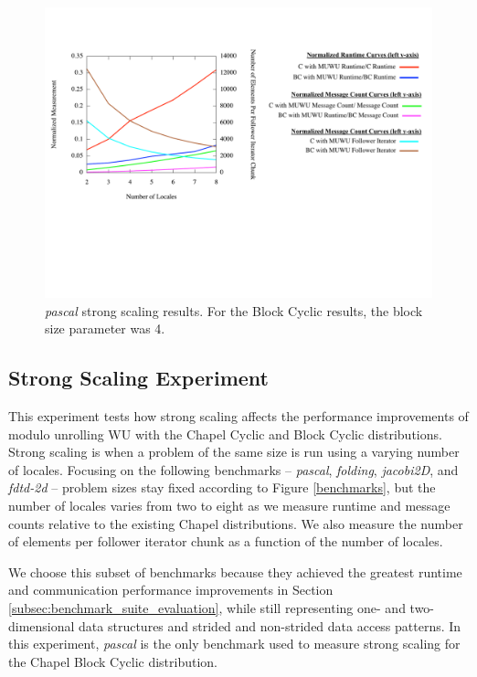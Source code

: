 \begin{figure}
\begin{center}
\includegraphics[width=\linewidth]{./Figures/strong_scaling/pascal.pdf}
\caption{\textit{pascal} strong scaling results. For the Block Cyclic results, the block size parameter was 4.}
\label{pascal_strong_scaling}
\end{center}
\end{figure}

\subsection{Strong Scaling Experiment}\label{subsec:strong_scaling}

This experiment tests how strong scaling affects the performance improvements of modulo unrolling WU with the Chapel Cyclic and Block Cyclic distributions. Strong scaling is when a problem of the same size is run using a varying number of locales. Focusing on the following benchmarks -- \textit{pascal}, \textit{folding}, \textit{jacobi2D}, and \textit{fdtd-2d} -- problem sizes stay fixed according to Figure \ref{benchmarks}, but the number of locales varies from two to eight as we measure runtime and message counts relative to the existing Chapel distributions. We also measure the number of elements per follower iterator chunk as a function of the number of locales. 

We choose this subset of benchmarks because they achieved the greatest runtime and communication performance improvements in Section \ref{subsec:benchmark_suite_evaluation}, while still representing one- and two-dimensional data structures and strided and non-strided data access patterns. In this experiment, \textit{pascal} is the only benchmark used to measure strong scaling for the Chapel Block Cyclic distribution. 


